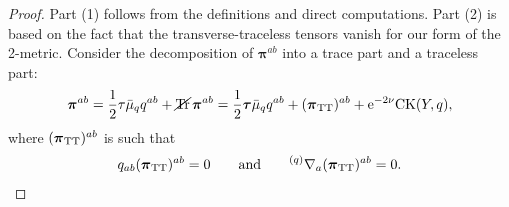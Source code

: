 \documentclass[11pt]{article}
\numberwithin{equation}{section}
\def\mbo#1{\boldsymbol{#1}}%
\def\grad{{\nabla}}%
\newcommand{\leftexp}[2]{{\vphantom{#2}}^{#1}{#2}}
\def\halb{\frac{1}{2}}%
\numberwithin{equation}{section}
\begin{document}
\begin{proof}
Part (1) follows from the definitions and direct computations. Part (2) is based on the fact that the transverse-traceless tensors vanish for our form of the 2-metric. Consider the decomposition of $\mbo{\pi}^{ab}$ into a trace part and a traceless part:
\begin{align} \label{split-pi}
\mbo{\pi}^{ab} = \halb \tau \bar{\mu}_q q^{ab} + \cancel{\operatorname{Tr}} \, \mbo{\pi}^{ab}
= \halb \mbo{\tau} \bar{\mu}_q q^{ab} + (\mbo{\pi}_{{\rm TT}})^{ab} + {\rm e}^{-2\nu} {\rm CK} (Y, q),
\end{align}
where $(\mbo{\pi}_{{\rm TT}})^{ab}$ is such that
\begin{align} \label{tt-cond}
q_{ab} (\mbo{\pi}_{{\rm TT}})^{ab} =0 \qquad \text{and} \qquad \leftexp{(q)}{\grad}_a (\mbo{\pi}_{{\rm TT}})^{ab} =0.
\end{align}


\end{proof}
\end{document}
